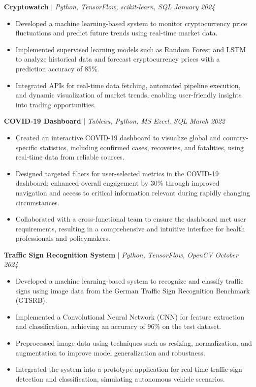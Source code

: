 \documentclass[letterpaper,11pt]{article}
\begin{document}
\textbf{Cryptowatch} $|$ \emph{Python, TensorFlow, scikit-learn, SQL} \hfill \textit{January 2024}
\begin{itemize}
    \item Developed a machine learning-based system to monitor cryptocurrency price fluctuations and predict future trends using real-time market data.
    \item Implemented supervised learning models such as Random Forest and LSTM to analyze historical data and forecast cryptocurrency prices with a prediction accuracy of 85\%.
    \item Integrated APIs for real-time data fetching, automated pipeline execution, and dynamic visualization of market trends, enabling user-friendly insights into trading opportunities.
\end{itemize}

\textbf{COVID-19 Dashboard} $|$ \emph{Tableau, Python, MS Excel, SQL} \hfill \textit{March 2022}
\begin{itemize}
    \item Created an interactive COVID-19 dashboard to visualize global and country-specific statistics, including confirmed cases, recoveries, and fatalities, using real-time data from reliable sources.
    \item Designed targeted filters for user-selected metrics in the COVID-19 dashboard; enhanced overall engagement by 30\% through improved navigation and access to critical information relevant during rapidly changing circumstances.
    \item Collaborated with a cross-functional team to ensure the dashboard met user requirements, resulting in a comprehensive and intuitive interface for health professionals and policymakers.
\end{itemize}

\textbf{Traffic Sign Recognition System} $|$ \emph{Python, TensorFlow, OpenCV} \hfill \textit{October 2024}
\begin{itemize}
    \item Developed a machine learning-based system to recognize and classify traffic signs using image data from the German Traffic Sign Recognition Benchmark (GTSRB).
    \item Implemented a Convolutional Neural Network (CNN) for feature extraction and classification, achieving an accuracy of 96\% on the test dataset.
    \item Preprocessed image data using techniques such as resizing, normalization, and augmentation to improve model generalization and robustness.
    \item Integrated the system into a prototype application for real-time traffic sign detection and classification, simulating autonomous vehicle scenarios.
\end{itemize}
\end{document}
